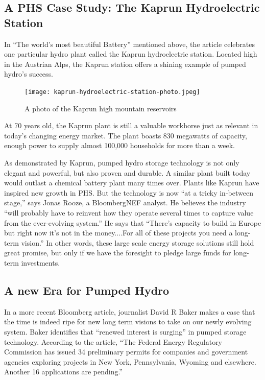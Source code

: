 \documentclass[hidelinks,12pt,a4paper]{article}
\begin{document}
\subsection{A PHS Case Study: The Kaprun Hydroelectric Station}
In “The world's most beautiful Battery” mentioned above, the article celebrates one particular hydro plant called the Kaprun hydroelectric station. Located high in the Austrian Alps, the Kaprun station offers a shining example of pumped hydro's success.


\begin{figure}[ht!]
    \centering
    \texttt{[image: kaprun-hydroelectric-station-photo.jpeg]}
    \caption{A photo of the Kaprun high mountain reservoirs \cite{MostBeautifulBattery}}
\end{figure}
\FloatBarrier

At 70 years old, the Kaprun plant is still a valuable workhorse just as relevant in today's changing energy market. The plant boasts 830 megawatts of capacity, enough power to supply almost 100,000 households for more than a week. \cite{MostBeautifulBattery}

As demonstrated by Kaprun, pumped hydro storage technology is not only elegant and powerful, but also proven and durable. A similar plant built today would outlast a chemical battery plant many times over. Plants like Kaprun have inspired new growth in PHS. But the technology is now “at a tricky in-between stage,” says Jonas Rooze, a BloombergNEF analyst. \cite{MostBeautifulBattery} He believes the industry “will probably have to reinvent how they operate several times to capture value from the ever-evolving system.” \cite{MostBeautifulBattery} He says that “There’s capacity to build in Europe but right now it’s not in the money....For all of these projects you need a long-term vision.” \cite{MostBeautifulBattery} In other words, these large scale energy storage solutions still hold great promise, but only if we have the foresight to pledge large funds for long-term investments.

\subsection{A new Era for Pumped Hydro}
In a more recent Bloomberg article, journalist David R Baker makes a case that the time is indeed ripe for new long term visions to take on our newly evolving system. Baker identifies that “renewed interest is surging” in pumped storage technology. \cite{QuestforBiggerBatteries} According to the article, “The Federal Energy Regulatory Commission has issued 34 preliminary permits for companies and government agencies exploring projects in New York, Pennsylvania, Wyoming and elsewhere. Another 16 applications are pending.” \cite{QuestforBiggerBatteries}
\end{document}
